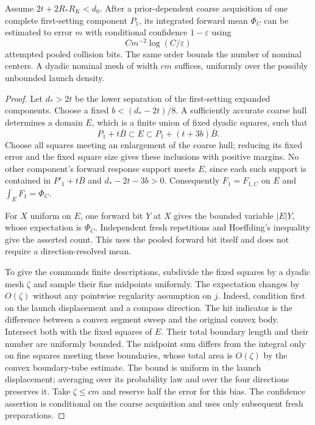 \begin{proposition}
\label{prop:unk-scale-flux-measure}
Assume $2t+2R_*R_K<d_0$. After a prior-dependent coarse acquisition
of one complete first-setting component $P_1$, its integrated
forward mean $\Phi_C$ can be estimated to error $m$ with conditional
confidence $1-\varepsilon$ using
\begin{equation}\label{eq:unk-scale-flux-cost}
                       C m^{-2}\log(C/\varepsilon)
\end{equation}
attempted pooled collision bits. The same order bounds the number
of nominal centers. A dyadic nominal mesh of width $c m$ suffices,
uniformly over the possibly unbounded launch density.
\end{proposition}
\begin{proof}
Let $d_*>2t$ be the lower separation of the first-setting expanded
components. Choose a fixed $b<(d_*-2t)/8$. A sufficiently accurate
coarse hull determines a domain $E$, which is a finite union of
fixed dyadic squares, such that
\[
 P_1+t\overline B\subset E
       \subset P_1+(t+3b)\overline B.
\]
Choose all squares meeting an enlargement of the coarse hull;
reducing its fixed error and the fixed square size gives these
inclusions with positive margins. No other component's forward
response support meets $E$, since each such support is contained
in $P'_1+t\overline B$ and $d_*-2t-3b>0$.
Consequently $F_1=F_{1,C}$ on $E$ and
$\int_E F_1=\Phi_C$.

For $X$ uniform on $E$, one forward bit $Y$ at $X$ gives the bounded
variable $|E|Y$, whose expectation is $\Phi_C$. Independent fresh
repetitions and Hoeffding's inequality give the asserted count.
This uses the pooled forward bit itself and does not require a
direction-resolved mean.

To give the commands finite descriptions, subdivide the fixed
squares by a dyadic mesh $\zeta$ and sample their fine midpoints
uniformly. The expectation changes by $O(\zeta)$ without any
pointwise regularity assumption on $j$. Indeed, condition first
on the launch displacement and a compass direction. The hit
indicator is the difference between a convex segment sweep and
the original convex body. Intersect both with the fixed squares
of $E$. Their total boundary length and their number are uniformly
bounded. The midpoint sum differs from the integral only on fine
squares meeting these boundaries, whose total area is
$O(\zeta)$ by the convex boundary-tube estimate. The bound is
uniform in the launch displacement; averaging over its probability
law and over the four directions preserves it. Take
$\zeta\le c m$ and reserve half the error for this bias. The
confidence assertion is conditional on the coarse acquisition
and uses only subsequent fresh preparations.
\end{proof}

